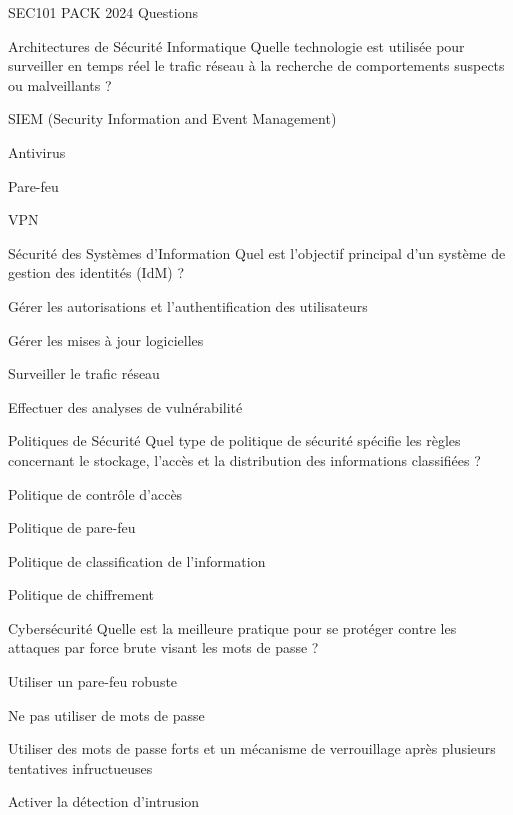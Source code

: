 \documentclass[12pt]{article}
\begin{document}
\begin{quiz}{SEC101 PACK 2024 Questions}
  \begin{multi}[points=1]{Architectures de Sécurité Informatique}
    Quelle technologie est utilisée pour surveiller en temps réel le trafic réseau à la recherche de comportements suspects ou malveillants ?
    \item* SIEM (Security Information and Event Management)
    \item Antivirus
    \item Pare-feu
    \item VPN
  \end{multi}

\begin{multi}[points=1]{Sécurité des Systèmes d'Information}
  Quel est l'objectif principal d'un système de gestion des identités (IdM) ?
  \item* Gérer les autorisations et l'authentification des utilisateurs
  \item Gérer les mises à jour logicielles
  \item Surveiller le trafic réseau
  \item Effectuer des analyses de vulnérabilité
\end{multi}

\begin{multi}[points=1]{Politiques de Sécurité}
  Quel type de politique de sécurité spécifie les règles concernant le stockage, l'accès et la distribution des informations classifiées ?
  \item Politique de contrôle d'accès
  \item Politique de pare-feu
  \item* Politique de classification de l'information
  \item Politique de chiffrement
\end{multi}

\begin{multi}[points=1]{Cybersécurité}
  Quelle est la meilleure pratique pour se protéger contre les attaques par force brute visant les mots de passe ?
  \item Utiliser un pare-feu robuste
  \item Ne pas utiliser de mots de passe
  \item* Utiliser des mots de passe forts et un mécanisme de verrouillage après plusieurs tentatives infructueuses
  \item Activer la détection d'intrusion
\end{multi}


\end{quiz}
\end{document}
